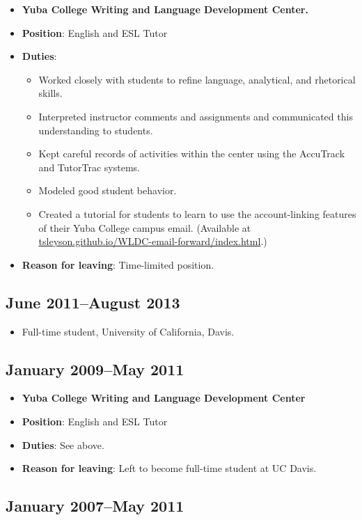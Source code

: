 \documentclass[12pt]{article}
\begin{document}
\begin{itemize}
\item \textbf{Yuba College Writing and Language Development Center.}
\item \textbf{Position}: English and ESL Tutor
\item \textbf{Duties}:
\begin{itemize}
\item Worked closely with students to refine language, analytical, and 
      rhetorical skills.
\item Interpreted instructor comments and assignments and communicated
      this understanding to students.
\item Kept careful records of activities within the center using the
      AccuTrack and TutorTrac systems.
\item Modeled good student behavior.
\item Created a tutorial for students to learn to use the 
      account-linking features of their Yuba College campus email.
      (Available at \href{tsleyson.github.io/WLDC-email-forward/index.html}{tsleyson.github.io/WLDC-email-forward/index.html}.)
\end{itemize}
\item \textbf{Reason for leaving}: Time-limited position.
\end{itemize}
\subsection*{June 2011–August 2013}
\label{sec-5-2}

\begin{itemize}
\item Full-time student, University of California, Davis.
\end{itemize}
\subsection*{January 2009–May 2011}
\label{sec-5-3}

\begin{itemize}
\item \textbf{Yuba College Writing and Language Development Center}
\item \textbf{Position}: English and ESL Tutor
\item \textbf{Duties}: See above.
\item \textbf{Reason for leaving}: Left to become full-time student at UC Davis.
\end{itemize}
\subsection*{January 2007–May 2011}
\label{sec-5-4}
\end{document}
